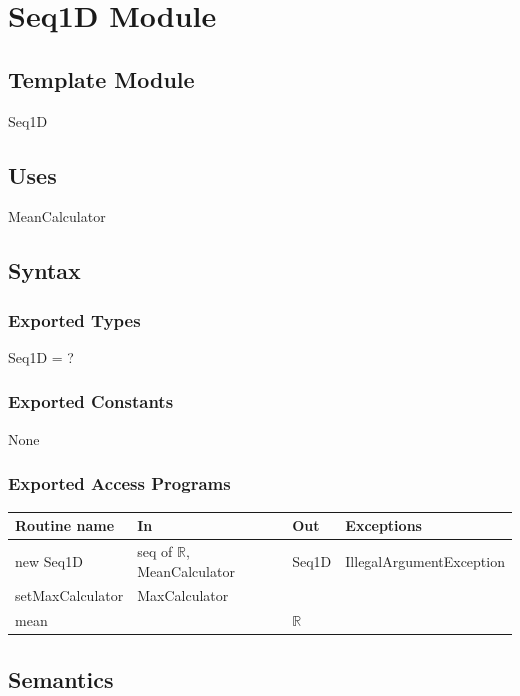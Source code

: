 \documentclass[12pt,fleqn]{examtst}
\begin{document}

\newpage

\section* {Seq1D Module}

\subsection* {Template Module}

Seq1D

\subsection* {Uses}

MeanCalculator

\subsection* {Syntax}

\subsubsection* {Exported Types}

Seq1D = ?

\subsubsection* {Exported Constants}

None

\subsubsection* {Exported Access Programs}

\begin{tabular}{| l | l | l | p{6cm} |}
\hline
\textbf{Routine name} & \textbf{In} & \textbf{Out} & \textbf{Exceptions}\\
\hline
new Seq1D & seq of $\mathbb{R}$, MeanCalculator & Seq1D & IllegalArgumentException\\
\hline
setMaxCalculator & MaxCalculator &  & \\
\hline
mean &  & $\mathbb{R}$ & \\
\hline

\end{tabular}

\subsection* {Semantics}
\end{document}
